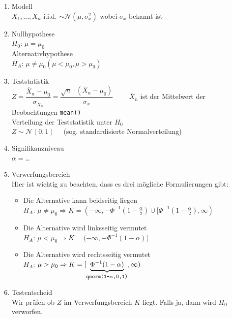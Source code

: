 \begin{enumerate}
  \item Modell \\
	  $X_1,...,X_n$ \acs{i.i.d.} $\sim\mathcal{N}(\mu, \sigma_x^2)$ 
	wobei $\sigma_x$ bekannt ist
  \item Nullhypothese \\
       	$H_0$: $ \mu=\mu_0$ \\
	Alternativhypothese \\
	$H_A$: $ \mu \neq \mu_0 (\mu < \mu_0, \mu > \mu_0)$
  \item Teststatistik \\
	  $Z=\dfrac{\overline{X}_n-\mu_0}{\sigma_{\overline{X}_n}} = 
	  \dfrac{\sqrt{n}\cdot(\overline{X}_n-\mu_0)}{\sigma_x}
	  \qquad $ $\overline{X}_n$ ist der Mittelwert der Beobachtungen
	  \verb!mean()!\\
	  Verteilung der Teststatistik unter $H_0$\\
	  $Z\sim\mathcal{N}(0,1)\quad$ (sog. standardisierte Normalverteilung)
  \item Signifikanzniveau \\
        $\alpha= $\dots
  \item Verwerfungsbereich \\
	Hier ist wichtig zu beachten, dass es drei mögliche Formulierungen
	gibt:
	\begin{itemize}
		\item	Die Alternative kann beidseitig liegen \\
		$H_A$: $\mu\neq\mu_0 \Rightarrow 
	 	K=(-\infty, -\Phi^{-1}(1-\frac{\alpha}{2})
		\cup [\Phi^{-1}(1-\frac{\alpha}{2}), \infty)$ \\
		\item Die Alternative wird linksseitig vermutet \\
		$H_A$: $\mu<\mu_0    \Rightarrow 
		K=(-\infty, -\Phi^{-1}(1-\alpha)] $ \\
		\item Die Alternative wird rechtsseitig vermutet \\
		$H_A$: $\mu>\mu_0    \Rightarrow 
		K=[\underbrace{\Phi^{-1}(1-\alpha)}_{\footnotesize
		\verb!qnorm(1-!\alpha\verb!,0,1)!}, \infty)$ \\
	\end{itemize}

  \item Testentscheid \\
	Wir prüfen ob $Z$ im Verwerfungsbereich $K$ liegt. Falls ja, 
	dann wird $H_0$ verworfen.
\end{enumerate}

